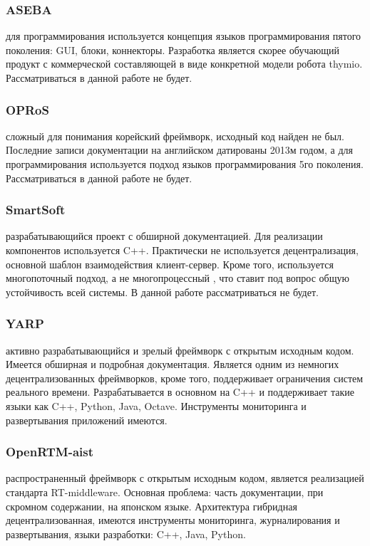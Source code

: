 \subsubsection{ASEBA} для программирования используется концепция языков программирования пятого поколения: GUI, блоки, коннекторы. Разработка является скорее обучающий продукт с коммерческой составляющей в виде конкретной модели робота thymio. Рассматриваться в данной работе не будет.

\subsubsection{OPRoS} сложный для понимания корейский фреймворк, исходный код найден не был. Последние записи документации на английском датированы 2013м годом, а для программирования используется подход языков программирования 5го поколения. Рассматриваться в данной работе не будет.

\subsubsection{SmartSoft} разрабатывающийся проект с обширной документацией. Для реализации компонентов используется C++. Практически не используется децентрализация, основной шаблон взаимодействия клиент-сервер. Кроме того, используется многопоточный подход, а не многопроцессный \cite{c3}, что ставит под вопрос общую устойчивость всей системы. В данной работе рассматриваться не будет.

\subsubsection{YARP} активно разрабатывающийся и зрелый фреймворк с открытым исходным кодом. Имеется обширная и подробная документация. Является одним из немногих децентрализованных фреймворков, кроме того, поддерживает ограничения систем реального времени. Разрабатывается в основном на C++ и поддерживает такие языки как C++, Python, Java, Octave. Инструменты мониторинга и развертывания приложений имеются.

\subsubsection{OpenRTM-aist} распространенный фреймворк с открытым исходным кодом, является реализацией стандарта RT-middleware. Основная проблема: часть документации, при скромном содержании, на японском языке. Архитектура гибридная децентрализованная, имеются инструменты мониторинга, журналирования и развертывания, языки разработки: C++, Java, Python.

